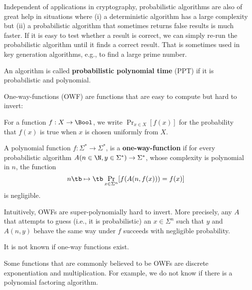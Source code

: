 Independent of applications in cryptography, probabilistic algorithms are also of great help in situations where (i) a deterministic algorithm has a large complexity but (ii) a probabilistic algorithm that sometimes returns false results is much faster.
If it is easy to test whether a result is correct, we can simply re-run the probabilistic algorithm until it finds a correct result.
That is sometimes used in key generation algorithms, e.g., to find a large prime number.

\begin{definition}
 An algorithm is called \textbf{probabilistic polynomial time} (PPT) if it is probabilistic and polynomial.
\end{definition}

One-way-functions (OWF) are functions that are easy to compute but hard to invert:

\newcommand{\Prob}[2]{\mathop{\mathrm{Pr}}_{#1}[#2]}

\begin{notation}
For a function $f:X\to\Bool$, we write $\Prob{x\in X}{f(x)}$ for the probability that $f(x)$ is true when $x$ is chosen uniformly from $X$.
\end{notation}

\begin{definition}
 A polynomial function $f:\Sigma^*\to \Sigma^*$, is a \textbf{one-way-function} if for every probabilistic algorithm $A(n\in\N,y\in \Sigma^*)\to\Sigma^*$, whose complexity is polynomial in $n$, the function
 \[n\tb\mapsto\tb \Prob{x\in\Sigma^n}{f(A(n,f(x)))=f(x)}\]
 is negligible.
\end{definition}
Intuitively, OWFs are super-polynomially hard to invert.
More precisely, any $A$ that attempts to guess (i.e., it is probabilistic) an $x\in\Sigma^n$ such that $y$ and $A(n,y)$ behave the same way under $f$ succeeds with negligible probability.

\begin{example}
It is not known if one-way functions exist.

Some functions that are commonly believed to be OWFs are discrete exponentiation and multiplication.
For example, we do not know if there is a polynomial factoring algorithm.
\end{example}

